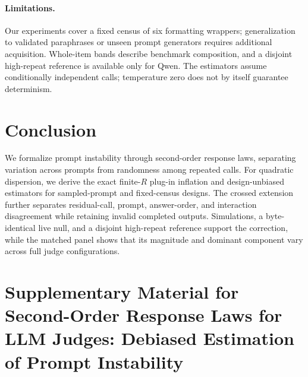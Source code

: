 \documentclass[letterpaper]{article}
\newcommand{\1}{\mathbf 1}
\newcommand{\reproductiontablelabel}[1]{\label{#1}}
\begin{document}
\paragraph{Limitations.}
Our experiments cover a fixed census of six formatting wrappers;
generalization to validated paraphrases or unseen prompt generators requires
additional acquisition. Whole-item bands describe benchmark composition, and a
disjoint high-repeat reference is available only for Qwen. The estimators
assume conditionally independent calls; temperature zero does not by itself
guarantee determinism.
\section{Conclusion}
 
We formalize prompt instability through second-order response laws,
separating variation across prompts from randomness among repeated calls. For quadratic dispersion, we derive the exact finite-$R$ plug-in inflation and design-unbiased
estimators for sampled-prompt and fixed-census designs. The crossed extension further separates residual-call,
prompt, answer-order, and interaction disagreement while retaining
invalid completed outputs.
Simulations, a byte-identical live null, and a disjoint high-repeat
reference support the correction, while the matched panel shows that
its magnitude and dominant component vary across full judge
configurations.


\clearpage
\setcounter{secnumdepth}{2}
\setcounter{section}{0}
\setcounter{subsection}{0}
\setcounter{subsubsection}{0}
\setcounter{equation}{0}
\setcounter{table}{0}
\setcounter{figure}{0}
\setcounter{theorem}{0}
\setcounter{definition}{0}
\setcounter{proposition}{0}
\setcounter{remark}{1}
\renewcommand{\thesection}{S\arabic{section}}
\renewcommand{\theequation}{S\arabic{equation}}
\renewcommand{\thetable}{S\arabic{table}}
\renewcommand{\thefigure}{S\arabic{figure}}
\renewcommand{\thetheorem}{S\arabic{theorem}}
\renewcommand{\thedefinition}{S\arabic{definition}}
\renewcommand{\theproposition}{S\arabic{proposition}}
\renewcommand{\theremark}{S\arabic{remark}}
\renewcommand{\reproductiontablelabel}[1]{\label{supp:#1}}

\section*{Supplementary Material for\\
Second-Order Response Laws for LLM Judges: Debiased Estimation of Prompt Instability}
\end{document}
